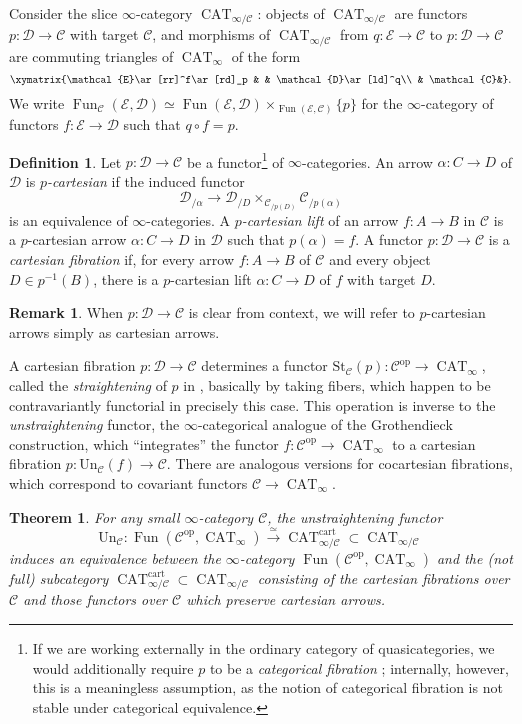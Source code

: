 \documentclass{article}
\newtheorem{theorem}{Theorem}[subsection]
\theoremstyle{definition}
\newtheorem{definition}{Definition}[subsection]
\newtheorem{remark}{Remark}[subsection]
\newcommand{\C}{\mathcal{C}}
\newcommand{\D}{\mathcal{D}}
\newcommand{\E}{\mathcal{E}}
\renewcommand{\i}{\infty}
\newcommand{\too}{\longrightarrow}
\newcommand{\op}{\mathrm{op}}
\DeclareMathOperator{\cart}{cart}
\DeclareMathOperator{\CAT}{CAT}
\DeclareMathOperator{\Fun}{Fun}
\begin{document}
Consider the slice $\i$-category $\CAT_{\i/\C}$: objects of $\CAT_{\i/\C}$ are functors $p:\D\to\C$ with target $\C$, and morphisms of $\CAT_{\i/\C}$ from $q:\E\to\C$ to $p:\D\to\C$ are commuting triangles of $\CAT_{\i}$ of the form
\[
\xymatrix{\E\ar[rr]^f\ar[rd]_p & & \D\ar[ld]^q\\
& \C &}.
\]
We write $\Fun_\C(\E,\D)\simeq\Fun(\E,\D)\times_{\Fun(\E,\C)}\{p\}$\index{$\Fun_\C$} for the $\i$-category of functors $f:\E\to\D$ such that $q\circ f = p$.

\begin{definition}
Let $p:\D\to\C$ be a functor\footnote{If we are working externally in the ordinary category of quasicategories, we would additionally require $p$ to be a {\em categorical fibration} \cite{HTT}; internally, however, this is a meaningless assumption, as the notion of categorical fibration is not stable under categorical equivalence.} of $\infty$-categories.
An arrow $\alpha:C\to D$ of $\D$ is {\em $p$-cartesian}
if the induced functor
\[
\D_{/\alpha}\too\D_{/D}\times_{\C_{/p(D)}} \C_{/p(\alpha)}
\]
is an equivalence of $\i$-categories.
A {\em $p$-cartesian lift} of an arrow $f:A\to B$ in $\C$ is a $p$-cartesian arrow $\alpha:C\to D$ in $\D$ such that $p(\alpha)=f$.
A functor $p:\D\to\C$ is a {\em cartesian fibration}
if, for every arrow $f:A\to B$ of $\C$ and every object $D\in p^{-1}(B)$, there is a $p$-cartesian lift $\alpha:C\to D$ of $f$ with target $D$.
\end{definition}

\begin{remark}
When $p:\D\to\C$ is clear from context, we will refer to $p$-cartesian arrows simply as cartesian arrows.
\end{remark} 
A cartesian fibration $p:\D\to\C$ determines a functor $\mathrm{St}_\C(p):\C^{\op}\to\CAT_\i$, called the {\em straightening} of $p$ in \cite{HTT}, basically by taking fibers, which happen to be contravariantly functorial in precisely this case.
This operation is inverse to the {\em unstraightening} functor, the $\i$-categorical analogue of the Grothendieck construction, which ``integrates'' the functor $f:\C^{\op}\to\CAT_\i$ to a cartesian fibration $p:\mathrm{Un}_\C(f)\to\C$.
There are analogous versions for cocartesian fibrations,
which correspond to covariant functors $\C\to\CAT_\i$.

\begin{theorem}{\em \cite[Theorem 3.2.0.1]{HTT}}
For any small $\infty$-category $\C$, the unstraightening functor
\[
\mathrm{Un}_\C\colon\Fun(\C^{\op},\CAT_\i)\overset{\simeq}{\too}\CAT_{\i/\C}^{\cart}\subset\CAT_{\i/\C}
\]
induces an equivalence between the $\infty$-category $\Fun(\C^{\op},\CAT_\i)$ and the (not full) subcategory $\CAT_{\i/\C}^{\cart}\subset\CAT_{\i/\C}$ consisting of the cartesian fibrations over $\C$ and those functors over $\C$ which preserve cartesian arrows.
\end{theorem}
\end{document}
